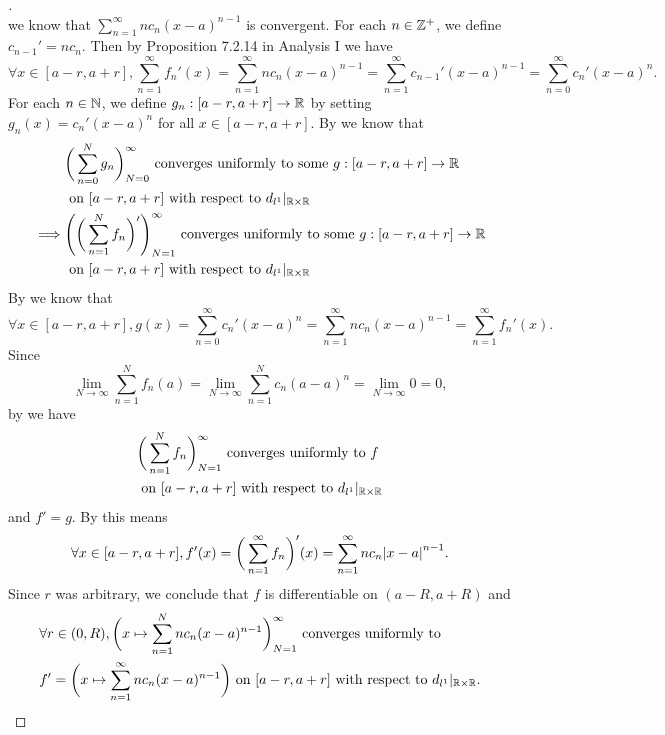 \begin{proof}[]
\[  \]
  we know that \(\sum_{n = 1}^\infty n c_n (x - a)^{n - 1}\) is convergent.
  For each \(n \in \mathbb{Z}^+\), we define \(c_{n - 1}' = n c_n\).
  Then by Proposition 7.2.14 in Analysis I we have
  \[
    \forall x \in [a - r, a + r], \sum_{n = 1}^\infty f_n'(x) = \sum_{n = 1}^\infty n c_n (x - a)^{n - 1} = \sum_{n = 1}^\infty c_{n - 1}' (x - a)^{n - 1} = \sum_{n = 0}^\infty c_n' (x - a)^n.
  \]
  For each \(n \in \mathbb{N}\), we define \(g_n : [a - r, a + r] \to \mathbb{R}\) by setting \(g_n(x) = c_n' (x - a)^n\) for all \(x \in [a - r, a + r]\).
  By  we know that
  \begin{align*}
             & \bigg(\sum_{n = 0}^N g_n\bigg)_{N = 0}^\infty \text{ converges uniformly to some } g : [a - r, a + r] \to \mathbb{R}              \\
             & \text{ on } [a - r, a + r] \text{ with respect to } d_{l^1}|_{\mathbb{R} \times \mathbb{R}}                                               \\
    \implies & \Bigg(\bigg(\sum_{n = 1}^N f_n\bigg)'\Bigg)_{N = 1}^\infty \text{ converges uniformly to some } g : [a - r, a + r] \to \mathbb{R} \\
             & \text{ on } [a - r, a + r] \text{ with respect to } d_{l^1}|_{\mathbb{R} \times \mathbb{R}}
  \end{align*}
  By  we know that
  \[
    \forall x \in [a - r, a + r], g(x) = \sum_{n = 0}^\infty c_n' (x - a)^n = \sum_{n = 1}^\infty n c_n (x - a)^{n - 1} = \sum_{n = 1}^\infty f_n'(x).
  \]
  Since
  \[
    \lim_{N \to \infty} \sum_{n = 1}^N f_n(a) = \lim_{N \to \infty} \sum_{n = 1}^N c_n (a - a)^n = \lim_{N \to \infty} 0 = 0,
  \]
  by  we have
  \begin{align*}
     & \bigg(\sum_{n = 1}^N f_n\bigg)_{N = 1}^\infty \text{ converges uniformly to } f \\
     & \text{ on } [a - r, a + r] \text{ with respect to } d_{l^1}|_{\mathbb{R} \times \mathbb{R}}
  \end{align*}
  and \(f' = g\).
  By  this means
  \[
    \forall x \in [a - r, a + r], f'(x) = \bigg(\sum_{n = 1}^\infty f_n\bigg)'(x) = \sum_{n = 1}^\infty n c_n \abs{x - a}^{n - 1}.
  \]
  Since \(r\) was arbitrary, we conclude that \(f\) is differentiable on \((a - R, a + R)\) and
  \begin{align*}
     & \forall r \in (0, R), \bigg(x \mapsto \sum_{n = 1}^N n c_n (x - a)^{n - 1}\bigg)_{N = 1}^\infty \text{ converges uniformly to }                   \\
     & f' = \bigg(x \mapsto \sum_{n = 1}^\infty n c_n (x - a)^{n - 1}\bigg) \text{ on } [a - r, a + r] \text{ with respect to } d_{l^1}|_{\mathbb{R} \times \mathbb{R}}.
  \end{align*}
\end{proof}

